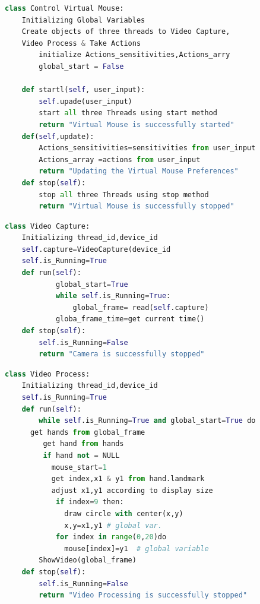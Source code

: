 \documentclass[12pt,a4paper]{report}
\begin{document}
	{
\begin{lstlisting}[language=Python, frame=single]
class Control Virtual Mouse:
	Initializing Global Variables 
   	Create objects of three threads to Video Capture,
   	Video Process & Take Actions 
       	initialize Actions_sensitivities,Actions_arry
    	global_start = False
    	
    def startl(self, user_input):        
        self.upade(user_input)
        start all three Threads using start method
        return "Virtual Mouse is successfully started"
    def(self,update):
        Actions_sensitivities=sensitivities from user_input
        Actions_array =actions from user_input
        return "Updating the Virtual Mouse Preferences"    
    def stop(self):
        stop all three Threads using stop method
        return "Virtual Mouse is successfully stopped"


\end{lstlisting}

\begin{lstlisting}[language=Python, frame=single]
class Video Capture:
	Initializing thread_id,device_id
	self.capture=VideoCapture(device_id
	self.is_Running=True
    def run(self):
    		global_start=True
    		while self.is_Running=True:        
        		global_frame= read(self.capture)
			globa_frame_time=get current time()
    def stop(self):
        self.is_Running=False
        return "Camera is successfully stopped"


\end{lstlisting}
\newpage
\begin{lstlisting}[language=Python, frame=single]
class Video Process:
	Initializing thread_id,device_id
	self.is_Running=True
    def run(self):
    	while self.is_Running=True and global_start=True do        
	  get hands from global_frame
	     get hand from hands
		 if hand not = NULL
		   mouse_start=1
		   get index,x1 & y1 from hand.landmark
		   adjust x1,y1 according to display size
		   	if index=9 then:
		   	  draw circle with center(x,y) 
		   	  x,y=x1,y1 # global var.
		   	for index in range(0,20)do
		   	  mouse[index]=y1  # global variable
		ShowVideo(global_frame)   	  		
    def stop(self):
        self.is_Running=False
        return "Video Processing is successfully stopped"


\end{lstlisting}}
\end{document}
